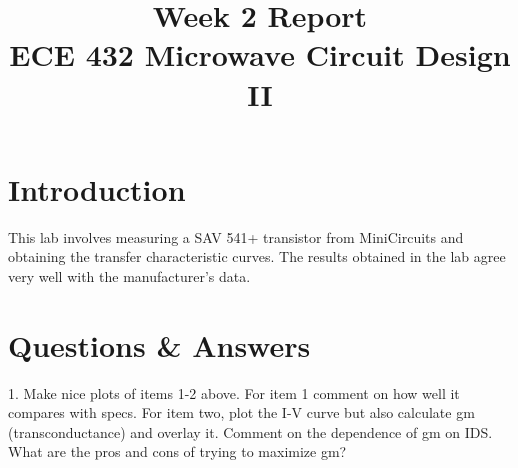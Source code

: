 \documentclass[conference]{IEEEtran}
\begin{document}
\title{Week 2 Report\\ECE 432 Microwave Circuit Design II}

\author{
}
\maketitle



\IEEEpeerreviewmaketitle


\section{Introduction}
This lab involves measuring a SAV 541+ transistor from MiniCircuits and obtaining the transfer characteristic curves.  The results obtained in the lab agree very well with the manufacturer's data.
\section{Questions \& Answers}
1. Make nice plots of items 1-2 above. For item 1 comment on how well it compares with specs. For item two, plot the I-V curve but also calculate gm (transconductance) and overlay it. Comment on the dependence of gm on IDS. What are the pros and cons of trying to maximize gm?\\\\\\
\end{document}
